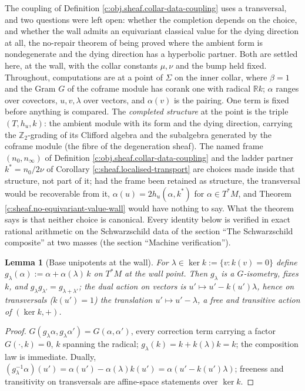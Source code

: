 \documentclass[11pt]{article}
\newtheorem{lemma}[theorem]{Lemma}
\theoremstyle{definition}
\theoremstyle{plain}
\providecommand{\R}{}\renewcommand{\R}{\mathbb{R}}
\providecommand{\Sig}{}\renewcommand{\Sig}{\Sigma}
\providecommand{\nInf}{}\renewcommand{\nInf}{n_\infty}
\providecommand{\nO}{}\renewcommand{\nO}{n_0}
\begin{document}
\label{c:note.sheaf.setting-transversal-independence-no-value-theorem}
The coupling of Definition \ref{c:obj.sheaf.collar-data-coupling} uses a transversal, and two questions were left open: whether the completion depends on the choice, and whether the wall admits an equivariant classical value for the dying direction at all, the no-repair theorem of \cite[Thm.~4.2]{ButlerT1} being proved where the ambient form is nondegenerate and the dying direction has a hyperbolic partner. Both are settled here, at the wall, with the collar constants $\mu, \nu$ and the bump held fixed. Throughout, computations are at a point of $\Sig$ on the inner collar, where $\beta = 1$ and the Gram $G$ of the coframe module has corank one with radical $\R k$; $\alpha$ ranges over covectors, $u, v, \lambda$ over vectors, and $\alpha(v)$ is the pairing. One term is fixed before anything is compared. The \emph{completed structure} at the point is the triple $(T, h_u, k)$: the ambient module with its form and the dying direction, carrying the $\mathbb{Z}_2$-grading of its Clifford algebra and the subalgebra generated by the coframe module (the fibre of the degeneration sheaf). The named frame $(\nO, \nInf)$ of Definition \ref{c:obj.sheaf.collar-data-coupling} and the ladder partner $k^* = \nO/2\nu$ of Corollary \ref{c:sheaf.localised-transport} are choices made inside that structure, not part of it; had the frame been retained as structure, the transversal would be recoverable from it, $\alpha(u) = 2h_u(\alpha, k^*)$ for $\alpha \in T^*M$, and Theorem \ref{c:sheaf.no-equivariant-value-wall} would have nothing to say. What the theorem says is that neither choice is canonical. Every identity below is verified in exact rational arithmetic on the Schwarzschild data of the section ``The Schwarzschild composite'' at two masses (the section ``Machine verification'').

\begin{lemma}[Base unipotents at the wall]\label{c:sheaf.base-unipotents-wall}
For $\lambda \in \ker k := \{v : k(v) = 0\}$ define $g_\lambda(\alpha) := \alpha + \alpha(\lambda)\,k$ on $T^*M$ at the wall point. Then $g_\lambda$ is a $G$-isometry, fixes $k$, and $g_\lambda g_{\lambda'} = g_{\lambda+\lambda'}$; the dual action on vectors is $u' \mapsto u' - k(u')\lambda$, hence on transversals ($k(u') = 1$) the translation $u' \mapsto u' - \lambda$, a free and transitive action of $(\ker k, +)$.
\end{lemma}
\begin{proof}
$G(g_\lambda\alpha, g_\lambda\alpha') = G(\alpha, \alpha')$, every correction term carrying a factor $G(\cdot, k) = 0$, $k$ spanning the radical; $g_\lambda(k) = k + k(\lambda)k = k$; the composition law is immediate. Dually, $(g_\lambda^{-1}\alpha)(u') = \alpha(u') - \alpha(\lambda)k(u') = \alpha(u' - k(u')\lambda)$; freeness and transitivity on transversals are affine-space statements over $\ker k$.

\end{proof}
\end{document}
